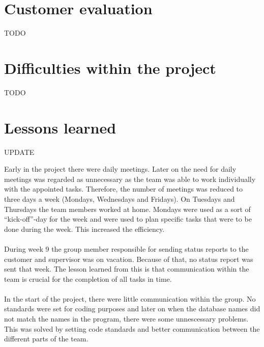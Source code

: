 \section{Customer evaluation}

TODO

\section{Difficulties within the project}

TODO

\section{Lessons learned}

UPDATE

Early in the project there were daily meetings. Later on the need for daily meetings was regarded as unnecessary as the team was able to work individually with the appointed tasks. Therefore, the number of meetings was reduced to three days a week (Mondays, Wednesdays and Fridays). On Tuesdays and Thursdays the team members worked at home. Mondays were used as a sort of “kick-off”-day for the week and were used to plan specific tasks that were to be done during the week. This increased the efficiency.\\
\\
During week 9 the group member responsible for sending status reports to the customer and supervisor was on vacation. Because of that, no status report was sent that week. The lesson learned from this is that communication within the team is crucial for the completion of all tasks in time.\\
\\
In the start of the project, there were little communication within the group. No standards were set
for coding purposes and later on when the database names did not match the names in the program, there were some unnescessary
problems. This was solved by setting code standards and better communication between the different 
parts of the team. 

